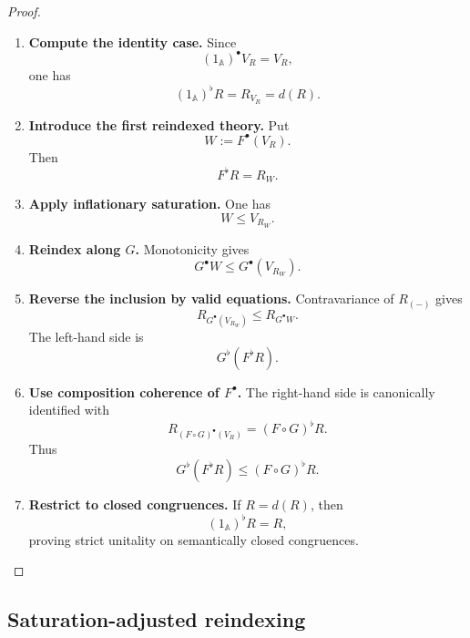 \begin{proof}
    \leavevmode
    \begin{enumerate}
        \item \textbf{Compute the identity case.}
        Since
        \[
            (1_{\mathbb A})^\bullet V_R=V_R,
        \]
        one has
        \[
            (1_{\mathbb A})^\flat R
            =
            R_{V_R}
            =
            d(R).
        \]

        \item \textbf{Introduce the first reindexed theory.}
        Put
        \[
            W:=F^\bullet(V_R).
        \]
        Then
        \[
            F^\flat R=R_W.
        \]

        \item \textbf{Apply inflationary saturation.}
        One has
        \[
            W\leq V_{R_W}.
        \]

        \item \textbf{Reindex along \(G\).}
        Monotonicity gives
        \[
            G^\bullet W
            \leq
            G^\bullet(V_{R_W}).
        \]

        \item \textbf{Reverse the inclusion by valid equations.}
        Contravariance of \(R_{(-)}\) gives
        \[
            R_{G^\bullet(V_{R_W})}
            \leq
            R_{G^\bullet W}.
        \]
        The left-hand side is
        \[
            G^\flat(F^\flat R).
        \]

        \item \textbf{Use composition coherence of \(F^\bullet\).}
        The right-hand side is canonically identified with
        \[
            R_{(F\circ G)^\bullet(V_R)}
            =
            (F\circ G)^\flat R.
        \]
        Thus
        \[
            G^\flat(F^\flat R)
            \leq
            (F\circ G)^\flat R.
        \]

        \item \textbf{Restrict to closed congruences.}
        If \(R=d(R)\), then
        \[
            (1_{\mathbb A})^\flat R=R,
        \]
        proving strict unitality on semantically closed congruences.
    \end{enumerate}
\end{proof}

\subsection{Saturation-adjusted reindexing}
\label{subsec:to-saturation-adjusted-reindexing}

